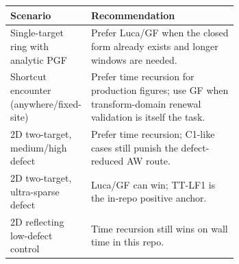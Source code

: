 \begin{tabular}{lp{0.66\linewidth}}
\toprule
Scenario & Recommendation \\
\midrule
Single-target ring with analytic PGF & Prefer Luca/GF when the closed form already exists and longer windows are needed. \\
Shortcut encounter (anywhere/fixed-site) & Prefer time recursion for production figures; use GF when transform-domain renewal validation is itself the task. \\
2D two-target, medium/high defect & Prefer time recursion; C1-like cases still punish the defect-reduced AW route. \\
2D two-target, ultra-sparse defect & Luca/GF can win; TT-LF1 is the in-repo positive anchor. \\
2D reflecting low-defect control & Time recursion still wins on wall time in this repo. \\
\bottomrule
\end{tabular}
